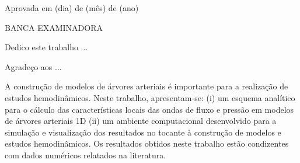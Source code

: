 \documentclass[
        english,			
        brazil			        %
        ,<...>]{abntbibufjf}
\begin{document}

\inserecapa

\inserefolhaderosto

\inserecatalog  


\begin{folhadeaprovacao}
\inicfolhaaprov
        
Aprovada em (dia) de (m\^es) de (ano) %
   
\vfill
\begin{center} BANCA EXAMINADORA \end{center}
\end{folhadeaprovacao}
\cleardoublepage 


 \begin{dedicatoria} 
  Dedico este trabalho ... 
 \end{dedicatoria}

 
\begin{agradecimentos}
Agrade\c{c}o aos ... 
\end{agradecimentos}


\begin{epigrafe} 
	A construção de modelos de árvores arteriais é importante para a realização de estudos hemodinâmicos. Neste trabalho, apresentam-se: (i) um esquema analítico para o cálculo das características locais das ondas de fluxo e pressão em modelos de árvores arteriais 1D (ii) um ambiente computacional desenvolvido para a simulação e visualização dos resultados no tocante à construção de modelos e estudos hemodinâmicos. Os resultados obtidos neste trabalho estão condizentes com dados numéricos relatados na literatura.
\end{epigrafe}
\end{document}
